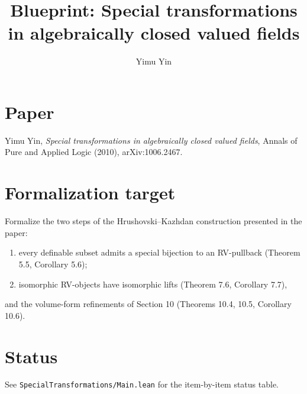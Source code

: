 \documentclass{article}
\title{Blueprint: Special transformations in algebraically closed valued fields}
\author{Yimu Yin}
\begin{document}
\maketitle

\section{Paper}
Yimu Yin, \emph{Special transformations in algebraically closed valued fields},
Annals of Pure and Applied Logic (2010), arXiv:1006.2467.

\section{Formalization target}
Formalize the two steps of the Hrushovski--Kazhdan construction presented in
the paper:
\begin{enumerate}
  \item every definable subset admits a special bijection to an RV-pullback
        (Theorem 5.5, Corollary 5.6);
  \item isomorphic RV-objects have isomorphic lifts (Theorem 7.6,
        Corollary 7.7),
\end{enumerate}
and the volume-form refinements of Section 10 (Theorems 10.4, 10.5,
Corollary 10.6).

\section{Status}
See \texttt{SpecialTransformations/Main.lean} for the item-by-item status table.
\end{document}
